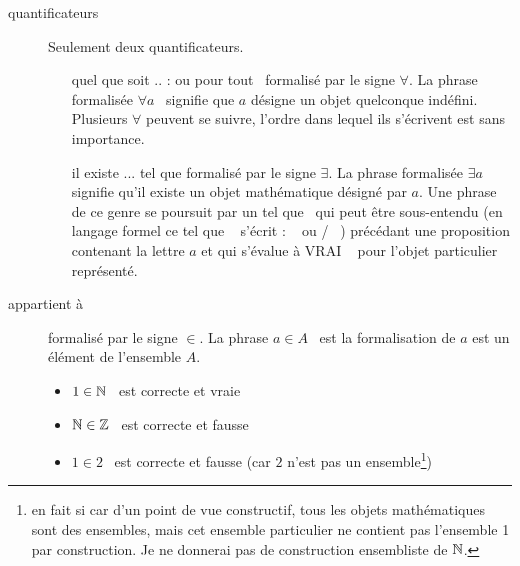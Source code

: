 \begin{description}
\item[quantificateurs] Seulement deux quantificateurs.
\begin{itemize}
 \item[\og quel que soit .. \fg: ] ou \og pour tout\fg~ formalisé par le signe $\forall$. La phrase formalisée \og$\forall a$\fg~ signifie que $a$ désigne un objet quelconque indéfini.  Plusieurs $\forall$ peuvent se suivre, l'ordre dans lequel ils s'écrivent est sans importance.
\item [\og il existe ... tel que \fg] formalisé par le signe $\exists$. La phrase formalisée \og$\exists a $\fg~ signifie qu'il existe un objet mathématique désigné par $a$. Une phrase de ce genre se poursuit par un \og tel que\fg~ qui peut être sous-entendu (en langage formel ce \og tel que \fg~ s'écrit \og : \fg~ ou \og / \fg~) précédant une proposition contenant la lettre $a$ et qui s'évalue à \og VRAI \fg~ pour l'objet particulier représenté.
\end{itemize}

\item[appartient à] formalisé par le signe $\in$. La phrase \og $a \in A $\fg~ est la formalisation de \og$a$ est un élément de l'ensemble $A$\fg.
\begin{itemize}
 \item \og $1 \in \mathbb{N}$\fg~ est correcte et vraie
 \item \og $\mathbb{N} \in \mathbb{Z}$\fg~ est correcte et fausse
 \item \og $ 1\in 2 $\fg~ est correcte et fausse (car $2$ n'est pas un ensemble\footnote{en fait si car d'un point de vue constructif, tous les objets mathématiques sont des ensembles, mais cet ensemble particulier ne contient pas l'ensemble 1 par construction. Je ne donnerai pas de construction ensembliste de $\mathbb{N}$.})
\end{itemize}


\end{description}
